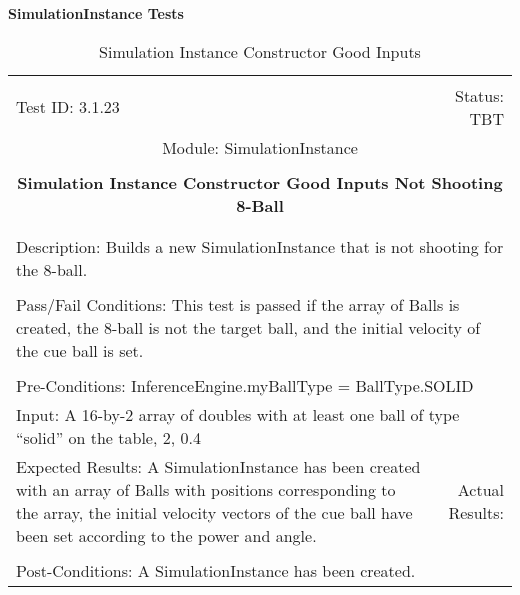 \documentclass[titlepage]{article}
\begin{document}
\large{\textbf{SimulationInstance Tests}}
\begin{center}%
\begin{table}[h!]
\begin{tabular}{|l r|}\hline&\\[-2mm]
	Test ID: 3.1.23	&Status: TBT\\[-3mm]
	\multicolumn{2}{|c|}{Module: SimulationInstance}\\&\\
	\multicolumn{2}{|c|}{\textbf{\large{Simulation Instance Constructor Good Inputs Not Shooting 8-Ball}}}\\&\\\hline&\\[-3mm]
	\multicolumn{2}{|p{\textwidth}|}{Description: Builds a new SimulationInstance that is not shooting for the 8-ball.}\\[1mm]\hline&\\[-3mm]
	\multicolumn{2}{|p{\textwidth}|}{Pass/Fail Conditions: This test is passed if the array of Balls is created, the 8-ball is not the target ball, and the initial velocity of the cue ball is set.}\\[1mm]\hline&\\[-3mm]
	\multicolumn{2}{|p{\textwidth}|}{Pre-Conditions: InferenceEngine.myBallType = BallType.SOLID}\\[4mm]
	\multicolumn{2}{|p{\textwidth}|}{Input: A 16-by-2 array of doubles with at least one ball of type ``solid'' on the table, 2, 0.4}\\[2mm]\hline
	\multicolumn{1}{|p{0.49\textwidth}}{Expected Results: A SimulationInstance has been created with an array of Balls with positions corresponding to the array, the initial velocity vectors of the cue ball have been set according to the power and angle.}	&\multicolumn{1}{|p{0.45\textwidth}|}{Actual Results: }\\\hline&\\[-3mm]
	\multicolumn{2}{|p{\textwidth}|}{Post-Conditions: A SimulationInstance has been created.}\\\hline
\end{tabular}
\caption{Simulation Instance Constructor Good Inputs}
\end{table}
\end{center}
\newpage
\end{document}
